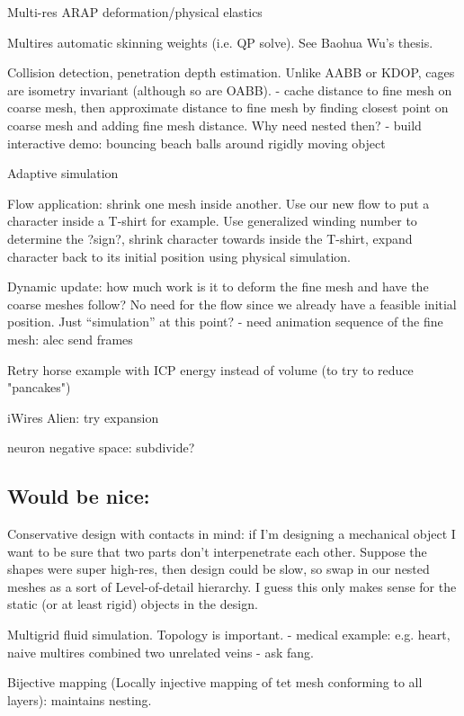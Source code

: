 Multi-res ARAP deformation/physical elastics

Multires automatic skinning weights (i.e. QP solve). See Baohua Wu's thesis.

Collision detection, penetration depth estimation. Unlike AABB or KDOP, cages
are isometry invariant (although so are OABB).
  - cache distance to fine mesh on coarse mesh, then approximate distance to
    fine mesh by finding closest point on coarse mesh and adding fine mesh
    distance. Why need nested then?
  - build interactive demo: bouncing beach balls around rigidly moving object

Adaptive simulation \cite{Debunne:2001:DRD}

Flow application: shrink one mesh inside another. Use our new flow to put a 
character inside a T-shirt for example. Use generalized winding number to 
determine the ?sign?, shrink character towards inside the T-shirt, 
expand character back to its initial position using physical simulation. 

Dynamic update: how much work is it to deform the fine mesh and have the coarse
meshes follow? No need for the flow since we already have a feasible initial
position. Just ``simulation'' at this point?
  - need animation sequence of the fine mesh: alec send frames

Retry horse example with ICP energy instead of volume (to try to reduce
"pancakes")

iWires Alien: try expansion 

neuron negative space: subdivide?

\subsection{Would be nice:}

Conservative design with contacts in mind: if I'm designing a mechanical object
I want to be sure that two parts don't interpenetrate each other. Suppose the
shapes were super high-res, then design could be slow, so swap in our nested
meshes as a sort of Level-of-detail hierarchy. I guess this only makes sense
for the static (or at least rigid) objects in the design.

Multigrid fluid simulation. Topology is important.
  - medical example: e.g. heart, naive multires combined two unrelated veins
  - ask fang.

Bijective mapping (Locally injective mapping of tet mesh conforming to all
layers): maintains nesting.
